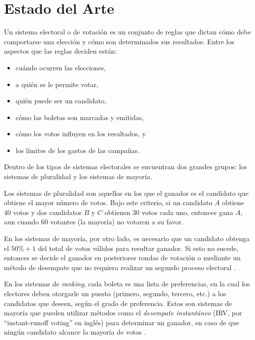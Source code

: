 \chapter{Estado del Arte}\label{chapter:state-of-the-art}

Un sistema electoral o de votación es un conjunto de reglas que dictan
cómo debe comportarse una elección y cómo son determinados sus
resultados. Entre los aspectos que las reglas deciden están:

\begin{itemize}
\item
  cuándo ocurren las elecciones,
\item
  a quién se le permite votar,
\item
  quién puede ser un candidato,
\item
  cómo las boletas son marcadas y emitidas,
\item
  cómo los votos influyen en los resultados, y
\item
  los límites de los gastos de las campañas.
\end{itemize}

Dentro de los tipos de sistemas electorales se encuentran dos grandes grupos: los sistemas de pluralidad y los sistemas de mayor\'ia. 

Los sistemas de pluralidad son aquellos en los que el ganador es el candidato que obtiene el mayor n\'umero de votos. Bajo este  criterio, si un candidato $A$ obtiene $40$ votos y dos candidatos $B$ y $C$ obtienen $30$ votos cada uno, entonces gana $A$, aun cuando $60$ votantes (la mayor\'ia) no votaron a su favor. 

En los sistemas de mayor\'ia, por otro lado, es necesario que un candidato obtenga el $50\% + 1$ del total de votos v\'alidos para resultar ganador. Si esto no sucede, entonces se decide el ganador en posteriores rondas de votaci\'on o mediante un m\'etodo de desempate que no requiera realizar un segundo proceso electoral \citep{electoral-systems-comparison}.

En los sistemas de \textit{ranking}, cada boleta es una lista de preferencias, en la cual los electores deben otorgarle un puesto (primero, segundo, tercero, etc.) a los  candidatos que deseen, seg\'un el grado de preferencia.  Estos son sistemas de mayor\'ia que pueden utilizar m\'etodos como el \textit{desempate instant\'aneo} (IRV, por ``instant-runoff voting'' en ingl\'es) para determinar un ganador, en caso de que ning\'un candidato alcance la mayor\'ia de votos \citep{electoral-systems-comparison}. 

